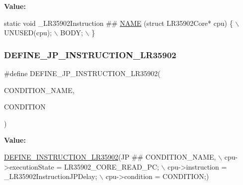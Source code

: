 {\bfseries Value\+:}
\begin{DoxyCode}
\textcolor{keyword}{static} \textcolor{keywordtype}{void} \_LR35902Instruction ## \mbox{\hyperlink{inflate_8h_a164ea0159d5f0b5f12a646f25f99eceaa67bc2ced260a8e43805d2480a785d312}{NAME}} (\textcolor{keyword}{struct} LR35902Core* cpu) \{ \(\backslash\)
        UNUSED(cpu); \(\backslash\)
        BODY; \(\backslash\)
    \}
\end{DoxyCode}
\mbox{\label{isa-lr35902_8c_af8b9399fa7bfddb7b4a29a7808ca6c67}} 
\subsubsection{\texorpdfstring{D\+E\+F\+I\+N\+E\+\_\+\+J\+P\+\_\+\+I\+N\+S\+T\+R\+U\+C\+T\+I\+O\+N\+\_\+\+L\+R35902}{DEFINE\_JP\_INSTRUCTION\_LR35902}}
{\footnotesize\ttfamily \#define D\+E\+F\+I\+N\+E\+\_\+\+J\+P\+\_\+\+I\+N\+S\+T\+R\+U\+C\+T\+I\+O\+N\+\_\+\+L\+R35902(\begin{DoxyParamCaption}\item[{}]{C\+O\+N\+D\+I\+T\+I\+O\+N\+\_\+\+N\+A\+ME,  }\item[{}]{C\+O\+N\+D\+I\+T\+I\+ON }\end{DoxyParamCaption})}

{\bfseries Value\+:}
\begin{DoxyCode}
\mbox{\hyperlink{isa-lr35902_8c_a3128fc43c5d01e8b51f67901c0b4b5ef}{DEFINE\_INSTRUCTION\_LR35902}}(JP ## CONDITION\_NAME, \(\backslash\)
        cpu->executionState = LR35902\_CORE\_READ\_PC; \(\backslash\)
        cpu->instruction = \_LR35902InstructionJPDelay; \(\backslash\)
        cpu->condition = CONDITION;)
\end{DoxyCode}
\mbox{\label{isa-lr35902_8c_a9767e2d15ec9fe3eb8b439485316616a}} 
